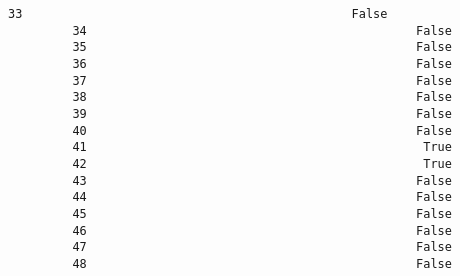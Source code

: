 \documentclass[11pt]{article}
\begin{document}
\begin{Verbatim}[commandchars=\\\{\}]
         33                                              False               
         34                                              False               
         35                                              False               
         36                                              False               
         37                                              False               
         38                                              False               
         39                                              False               
         40                                              False               
         41                                               True               
         42                                               True               
         43                                              False               
         44                                              False               
         45                                              False               
         46                                              False               
         47                                              False               
         48                                              False               
         

\end{Verbatim}
\end{document}

